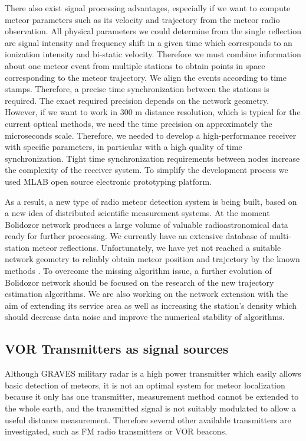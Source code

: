 \documentclass[twoside]{ctuthesis}
\theoremstyle{plain}
\theoremstyle{definition}
\theoremstyle{note}
\begin{document}
There also exist signal processing advantages, especially if we want to compute meteor parameters such as its velocity and trajectory from the meteor radio observation. All physical parameters we could determine from the single reflection are signal intensity and frequency shift in a given time which corresponds to an ionization intensity and bi-static velocity.
Therefore we must combine information about one meteor event from multiple stations to obtain points in space corresponding to the meteor trajectory. We align the events according to time stamps. Therefore, a precise time synchronization between the stations is required. The exact required precision depends on the network geometry. However, if we want to work in 300 m distance resolution, which is typical for the current optical methods, we need the time precision on approximately the microseconds scale. Therefore, we needed to develop a high-performance receiver with specific parameters, in particular with a high quality of time synchronization. Tight time synchronization requirements between nodes increase the complexity of the receiver system. To simplify the development process we used MLAB open source electronic prototyping platform.

As a result, a new type of radio meteor detection system is being built, based on a new idea of distributed scientific measurement systems. At the moment Bolidozor network produces a large volume of valuable radioastronomical data ready for further processing.  
We currently have an extensive database of multi-station meteor reflections. Unfortunately, we have yet not reached a suitable network geometry to reliably obtain meteor position and trajectory by the known methods \cite{Doppler_method}. 
To overcome the missing algorithm issue, a further evolution of Bolidozor network should be focused on the research of the new trajectory estimation algorithms. We are also working on the network extension with the aim of extending its service area as well as increasing the station's density which should decrease data noise and improve the numerical stability of algorithms. 

\subsection{VOR Transmitters as signal sources}
Although GRAVES military radar is a high power transmitter which easily allows basic detection of meteors, it is not an optimal system for meteor localization because it only has one transmitter, measurement method cannot be extended to the whole earth, and the transmitted signal is not suitably modulated to allow a useful distance measurement.  Therefore several other available transmitters are investigated, such as FM radio transmitters or VOR beacons. 
\end{document}
